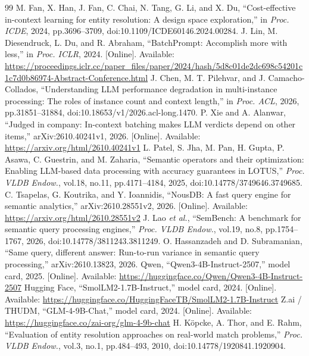 \begin{thebibliography}{99}
 M. Fan, X. Han, J. Fan, C. Chai, N. Tang, G. Li, and X. Du, ``Cost-effective in-context learning for entity resolution: A design space exploration,'' in \emph{Proc. ICDE}, 2024, pp.3696--3709, doi:10.1109/ICDE60146.2024.00284.
 J. Lin, M. Diesendruck, L. Du, and R. Abraham, ``BatchPrompt: Accomplish more with less,'' in \emph{Proc. ICLR}, 2024. [Online]. Available: \url{https://proceedings.iclr.cc/paper_files/paper/2024/hash/5d8c01de2dc698c54201c1c7d0b86974-Abstract-Conference.html}
 J. Chen, M. T. Pilehvar, and J. Camacho-Collados, ``Understanding LLM performance degradation in multi-instance processing: The roles of instance count and context length,'' in \emph{Proc. ACL}, 2026, pp.31851--31884, doi:10.18653/v1/2026.acl-long.1470.
 P. Xie and A. Alanwar, ``Judged in company: In-context batching makes LLM verdicts depend on other items,'' arXiv:2610.40241v1, 2026. [Online]. Available: \url{https://arxiv.org/html/2610.40241v1}
 L. Patel, S. Jha, M. Pan, H. Gupta, P. Asawa, C. Guestrin, and M. Zaharia, ``Semantic operators and their optimization: Enabling LLM-based data processing with accuracy guarantees in LOTUS,'' \emph{Proc. VLDB Endow.}, vol.18, no.11, pp.4171--4184, 2025, doi:10.14778/3749646.3749685.
 C. Tsapelas, G. Koutrika, and Y. Ioannidis, ``NousDB: A fast query engine for semantic analytics,'' arXiv:2610.28551v2, 2026. [Online]. Available: \url{https://arxiv.org/html/2610.28551v2}
 J. Lao \emph{et al.}, ``SemBench: A benchmark for semantic query processing engines,'' \emph{Proc. VLDB Endow.}, vol.19, no.8, pp.1754--1767, 2026, doi:10.14778/3811243.3811249.
 O. Hassanzadeh and D. Subramanian, ``Same query, different answer: Run-to-run variance in semantic query processing,'' arXiv:2610.13823, 2026.
 Qwen, ``Qwen3-4B-Instruct-2507,'' model card, 2025. [Online]. Available: \url{https://huggingface.co/Qwen/Qwen3-4B-Instruct-2507}
 Hugging Face, ``SmolLM2-1.7B-Instruct,'' model card, 2024. [Online]. Available: \url{https://huggingface.co/HuggingFaceTB/SmolLM2-1.7B-Instruct}
 Z.ai / THUDM, ``GLM-4-9B-Chat,'' model card, 2024. [Online]. Available: \url{https://huggingface.co/zai-org/glm-4-9b-chat}
 H. K\"opcke, A. Thor, and E. Rahm, ``Evaluation of entity resolution approaches on real-world match problems,'' \emph{Proc. VLDB Endow.}, vol.3, no.1, pp.484--493, 2010, doi:10.14778/1920841.1920904.

\end{thebibliography}
